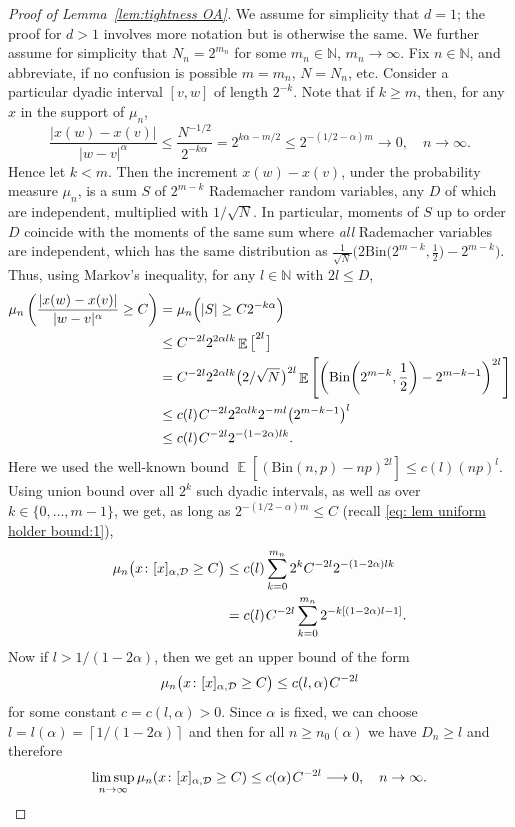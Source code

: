 \documentclass[11pt, letterpaper]{article}
\let\sig\relax
\DeclareMathOperator{\sig}{S}
\theoremstyle{definition}
\theoremstyle{remark}
\DeclareMathOperator{\E}{\mathbb{E}}
\newcommand{\m}{\hspace{0.25mm}}
\newcommand{\N}{\mathbb{N}}
\begin{document}
\begin{appendices}
\begin{proof}[Proof of Lemma~\ref{lem:tightness OA}]
    We assume for simplicity that $d = 1$; the proof for $d > 1$ involves more notation but is otherwise the same. We further assume for simplicity that $N_n = 2^{m_n}$ for some $m_n\in \N$, $m_n \to \infty$. Fix $n\in \N$, and abbreviate, if no confusion is possible $m = m_n$, $N = N_n$, etc. Consider a particular dyadic interval $[v,w]$ of length $2^{-k}$. Note that if $k \ge m$, then, for any $x$ in the support of $\mu_n$, 
    \begin{equation}\label{eq: lem uniform holder bound:1}
    \frac{|x(w)-x(v)|}{|w-v|^\alpha} \le \frac{N^{-1/2}}{2^{-k\alpha}} = 2^{k\alpha - m / 2} \le 2^{-(1/2 - \alpha) m} \to 0,\quad n\to \infty.
    \end{equation}
    Hence let $k < m$. Then the increment $x(w) - x(v)$, under the probability measure $\mu_n$, is a sum $S$ of $2^{m - k}$ Rademacher random variables, any $D$ of which are independent, multiplied with $1 / \sqrt{N}$.
    In particular, moments of $S$ up to order $D$ coincide with the moments of the same sum where \emph{all} Rademacher variables are independent,
    which has the same distribution as $\frac{1}{\sqrt{N}}\big(2\text{Bin}\big(2^{m-k},\frac 12\big) - 2^{m-k}\big)$.
    Thus, using Markov's inequality, for any $l\in\N$ with $2l \le D$,
    \begin{align*}
        \mu_n\left(\frac{|x(w)-x(v)|}{|w-v|^\alpha} \ge C\right)
        &= \mu_n\Big(|S| \ge C 2^{-k\alpha}\Big)\\
        &\le C^{-2l} 2^{2\alpha lk} \E \big[\sig^{2l}\m\big]\\
        &= C^{-2l} 2^{2\alpha lk} \big(2/\sqrt{N}\m\big)^{2l}\E\Bigg[ \bigg(\textrm{Bin}\bigg(2^{m-k},\frac 12\bigg) - 2^{m-k-1}\bigg)^{2l}\m\Bigg]\\
        &\le c(l)\m C^{-2l} 2^{2\alpha lk} 2^{-ml} \big(2^{m-k-1}\big)^l\\
        &\le c(l)\m C^{-2l} 2^{-(1-2\alpha) lk}.
    \end{align*}
    Here we used the well-known bound $\E[(\text{Bin}(n,p)-np)^{2l}] \le c(l) (np)^l$.
    Using union bound over all $2^k$ such dyadic intervals, as well as over $k\in\{0,\ldots,m-1\}$, we get, as long as $2^{-(1/2-\alpha) m} \le C$ (recall \eqref{eq: lem uniform holder bound:1}), 
    \begin{align*}
    \mu_n \big(x\colon [x]_{\alpha,\mathcal{D}} \ge C\big) 
    &\le c(l)\sum_{k=0}^{m_n} 2^k C^{-2l} 2^{-(1-2\alpha) lk}\\
    &= c(l)\m C^{-2l} \sum_{k=0}^{m_n} 2^{-k[(1-2\alpha)l - 1]}.
    \end{align*}
    Now if $l > 1 / (1-2\alpha)$, then we get an upper bound of the form \[
        \mu_n \big(x\colon [x]_{\alpha,\mathcal{D}} \ge C\big) \le c(l,\alpha)\m C^{-2l}
    \] for some constant $c = c(l,\alpha) > 0$. Since $\alpha$ is fixed, we can choose $l = l(\alpha) = \left\lceil 1 / (1-2\alpha) \right\rceil$ and then for all $n \ge n_0(\alpha)$ we have $D_n \ge l$ and therefore \[
    \limsup_{n\to \infty} \mu_n(x\colon [x]_{\alpha,\mathcal{D}} \ge C) \le c(\alpha)\m C^{-2l} \longrightarrow 0,\quad n\to \infty.
    \]


\end{proof}
\end{appendices}
\end{document}
